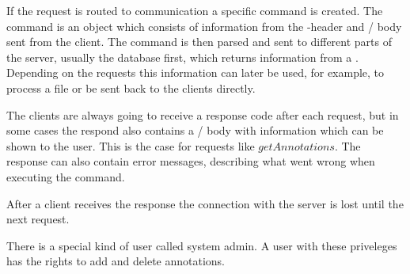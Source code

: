 If the request is routed to communication a specific command is
created. The command is an object which consists of information from
the -header and \json/ body sent from the
client. The command is then parsed and sent to different parts of the
server, usually the database first, which returns information from a
. Depending on the requests this information can later
be used, for example, to process a file or be sent back to the clients
directly.

The clients are always going to receive a response code after each
request, but in some cases the respond also contains a \json/
body with information which can be shown to the user. This is the case
for requests like $getAnnotations$. The response can also contain
error messages, describing what went wrong when executing the command.

After a client receives the response the connection with the server is
lost until the next request.

There is a special kind of user called system admin. A user with these
priveleges has the rights to add and delete annotations.
